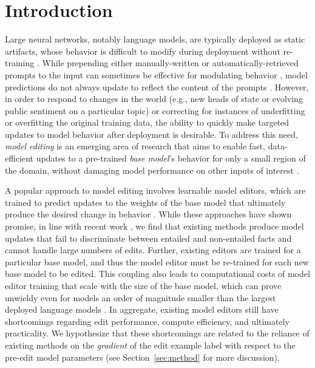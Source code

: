 \documentclass{article}
\begin{document}
\section{Introduction}


Large neural networks, notably language models, are typically deployed as static artifacts, whose behavior is difficult to modify during deployment without re-training \citep{lazaridou2021mind}. While prepending either manually-written or automatically-retrieved prompts to the input can sometimes be effective for modulating behavior \citep{brown2020language}, model predictions do not always update to reflect the content of the prompts \citep{lewis2020retrieval,Paranjape2021HindsightPT}. However, in order to respond to changes in the world (e.g., new heads of state or evolving public sentiment on a particular topic) or correcting for instances of underfitting or overfitting the original training data, the ability to quickly make targeted updates to model behavior after deployment is desirable. To address this need, \textit{model editing} is an emerging area of research that aims to enable fast, data-efficient updates to a pre-trained \textit{base model}'s behavior for only a small region of the domain, without damaging model performance on other inputs of interest \citep{Sinitsin2020Editable,zhu2020modifying,sotoudeh2019correcting,Cao2021EditingFK,dai2021knowledge,mitchell2021fast,hase2021language,meng2022locating}.



A popular approach to model editing involves learnable model editors, which are trained to predict updates to the weights of the base model that ultimately produce the desired change in behavior \citep{Sinitsin2020Editable,Cao2021EditingFK,mitchell2021fast,hase2021language}. While these approaches have shown promise, in line with recent work \citep{hase2021language}, we find that existing methods produce model updates that fail to discriminate between entailed and non-entailed facts and cannot handle large numbers of edits. Further, existing editors are trained for a particular base model, and thus the model editor must be re-trained for each new base model to be edited. This coupling also leads to computational costs of model editor training that scale with the size of the base model, which can prove unwieldy even for models an order of magnitude smaller than the largest deployed language models \citep{mitchell2021fast}. In aggregate, existing model editors still have shortcomings regarding edit performance, compute efficiency, and ultimately practicality. We hypothesize that these shortcomings are related to the reliance of existing methods on the \textit{gradient} of the edit example label with respect to the pre-edit model parameters (see Section~\ref{sec:method} for more discussion).
\end{document}

